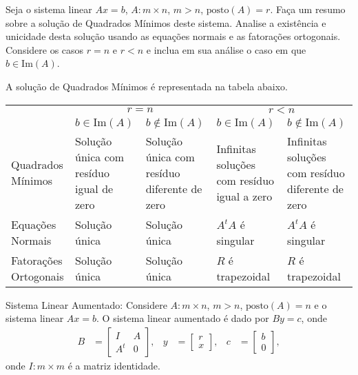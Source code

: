 \documentclass[a4paper,12pt, leqno, answers]{exam}
\begin{document}
\begin{questions}
    \question Seja o sistema linear $A x = b$, $A : m \times n$, $m > n$, $\text{posto}(A) = r$. Fa\c{c}a um resumo sobre a solu\c{c}\~{a}o de Quadrados M\'{i}nimos deste sistema. Analise a exist\^{e}ncia e unicidade desta solu\c{c}\~{a}o usando as equa\c{c}\~{o}es normais e as fatora\c{c}\~{o}es ortogonais. Considere os casos $r = n$ e $r < n$ e inclua em sua an\'{a}lise o caso em que $b \in \text{Im}(A)$.
    \begin{solution}
        A solu\c{c}\~{a}o de Quadrados M\'{i}nimos \'{e} representada na tabela abaixo.
        \begin{center}
            \begin{tabular}{|p{}|p{}|p{}|p{}|p{}|}
                \cline{2-5}
                \multicolumn{1}{c|}{} & \multicolumn{2}{|c|}{$r = n$} & \multicolumn{2}{|c|}{$r < n$} \\ \cline{2-5}
                \multicolumn{1}{c|}{} & $b \in \text{Im}(A)$ & $b \not\in \text{Im}(A)$ & $b \in \text{Im}(A)$ & $b \not\in \text{Im}(A)$ \\ \hline
                Quadrados M\'{i}nimos & Solu\c{c}\~{a}o \'{u}nica com res\'{i}duo igual de zero & Solu\c{c}\~{a}o \'{u}nica com res\'{i}duo diferente de zero & Infinitas solu\c{c}\~{o}es com res\'{i}duo igual a zero & Infinitas solu\c{c}\~{o}es com res\'{i}duo diferente de zero \\ \hline
                Equa\c{c}\~{o}es Normais & Solu\c{c}\~{a}o \'{u}nica & Solu\c{c}\~{a}o \'{u}nica & $A^t A$ \'{e} singular & $A^t A$ \'{e} singular \\ \hline
                Fatora\c{c}\~{o}es Ortogonais & Solu\c{c}\~{a}o \'{u}nica & Solu\c{c}\~{a}o \'{u}nica & $R$ \'{e} trapezoidal & $R$ \'{e} trapezoidal \\ \hline
            \end{tabular}
        \end{center}
    \end{solution}

    \question Sistema Linear Aumentado: Considere $A : m \times n$, $m > n$, $\text{posto}(A) = n$ e o sistema linear $A x = b$. O sistema linear aumentado \'{e} dado por $B y = c$, onde
    \begin{align*}
        B &= \begin{bmatrix}
            I & A \\
            A^t & 0
        \end{bmatrix}, & y &= \begin{bmatrix}
            r \\
            x
        \end{bmatrix}, & c &= \begin{bmatrix}
            b \\
            0
        \end{bmatrix},
    \end{align*}
    onde $I : m \times m$ \'{e} a matriz identidade.


\end{questions}
\end{document}
